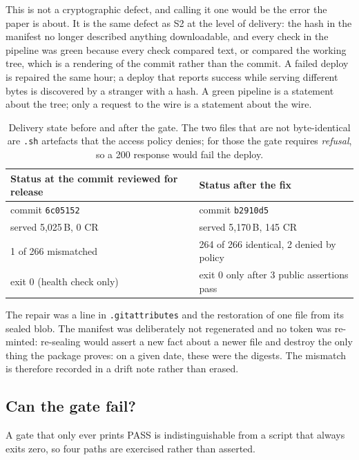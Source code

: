 This is not a cryptographic defect, and calling it one would be the error the
paper is about. It is the same defect as S2 at the level of delivery: the hash in
the manifest no longer described anything downloadable, and every check in the
pipeline was green because every check compared text, or compared the working
tree, which is a rendering of the commit rather than the commit. A failed deploy
is repaired the same hour; a deploy that reports success while serving different
bytes is discovered by a stranger with a hash. A green pipeline is a statement
about the tree; only a request to the wire is a statement about the wire.

\begin{table}[t]
\centering
\small
\begin{tabular}{@{}ll@{}}
\toprule
Status at the commit reviewed for release & Status after the fix \\
\midrule
commit \texttt{6c05152} & commit \texttt{b2910d5} \\
served 5{,}025\,B, 0 CR & served 5{,}170\,B, 145 CR \\
1 of 266 mismatched     & 264 of 266 identical, 2 denied by policy \\
exit 0 (health check only) & exit 0 only after 3 public assertions pass \\
\bottomrule
\end{tabular}
\caption{Delivery state before and after the gate. The two files that are not
byte-identical are \texttt{.sh} artefacts that the access policy denies; for
those the gate requires \emph{refusal}, so a 200 response would fail the deploy.}
\label{tab:deploy}
\end{table}

The repair was a line in \texttt{.gitattributes} and the restoration of one file
from its sealed blob. The manifest was deliberately not regenerated and no token
was re-minted: re-sealing would assert a new fact about a newer file and destroy
the only thing the package proves: on a given date, these were the digests. The mismatch is therefore recorded in a drift note rather than erased.

\subsection{Can the gate fail?}
\label{sec:eval-negative}

A gate that only ever prints PASS is indistinguishable from a script that always
exits zero, so four paths are exercised rather than asserted.

